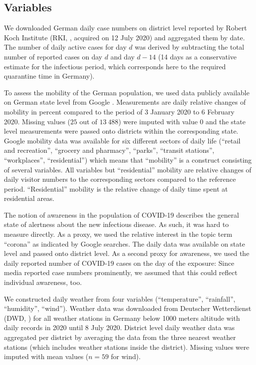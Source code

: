 \documentclass[]{elsarticle} %
\begin{document}
\hypertarget{variables}{%
\subsection{Variables}\label{variables}}

We downloaded German daily case numbers on district level reported by Robert Koch Institute (RKI, \citep{casenumbers_rki}, acquired on 12 July 2020) and aggregated them by date. The number of daily active cases for day \(d\) was derived by subtracting the total number of reported cases on day \(d\) and day \(d-14\) (14 days as a conservative estimate for the infectious period, which corresponds here to the required quarantine time in Germany).

To assess the mobility of the German population, we used data publicly available on German state level from Google \citep{google_mobility}. Measurements are daily relative changes of mobility in percent compared to the period of 3 January 2020 to 6 February 2020. Missing values (\(25\) out of \(13{\ }488\)) were imputed with value \(0\) and the state level measurements were passed onto districts within the corresponding state. Google mobility data was available for six different sectors of daily life (``retail and recreation'', ``grocery and pharmacy'', ``parks'', ``transit stations'', ``workplaces'', ``residential'') which means that ``mobility'' is a construct consisting of several variables. All variables but ``residential'' mobility are relative changes of daily visitor numbers to the corresponding sectors compared to the reference period. ``Residential'' mobility is the relative change of daily time spent at residential areas.

The notion of awareness in the population of COVID-19 describes the general state of alertness about the new infectious disease. As such, it was hard to measure directly. As a proxy, we used the relative interest in the topic term ``corona'' as indicated by Google searches. The daily data was available on state level \citep{google_trends} and passed onto district level. As a second proxy for awareness, we used the daily reported number of COVID-19 cases on the day of the exposure: Since media reported case numbers prominently, we assumed that this could reflect individual awareness, too.

We constructed daily weather from four variables (``temperature'', ``rainfall'', ``humidity'', ``wind''). Weather data was downloaded from Deutscher Wetterdienst (DWD, \citep{dwd_weather}) for all weather stations in Germany below 1000 meters altitude with daily records in 2020 until 8 July 2020. District level daily weather data was aggregated per district by averaging the data from the three nearest weather stations (which includes weather stations inside the district). Missing values were imputed with mean values (\(n=59\) for wind).
\end{document}
